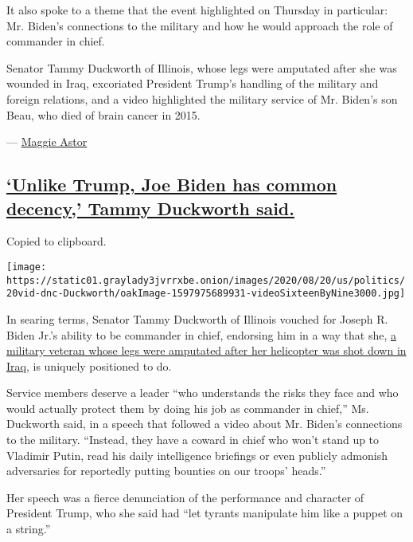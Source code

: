 It also spoke to a theme that the event highlighted on Thursday in
particular: Mr. Biden's connections to the military and how he would
approach the role of commander in chief.

Senator Tammy Duckworth of Illinois, whose legs were amputated after she
was wounded in Iraq, excoriated President Trump's handling of the
military and foreign relations, and a video highlighted the military
service of Mr. Biden's son Beau, who died of brain cancer in 2015.

--- \href{https://www.nytimes3xbfgragh.onion/by/maggie-astor}{Maggie
Astor}

\hypertarget{unlike-trump-joe-biden-has-common-decency-tammy-duckworth-said}{%
\subsection{\texorpdfstring{\protect\hyperlink{unlike-trump-joe-biden-has-common-decency-tammy-duckworth-said}{`Unlike
Trump, Joe Biden has common decency,' Tammy Duckworth
said.}}{`Unlike Trump, Joe Biden has common decency,' Tammy Duckworth said.}}\label{unlike-trump-joe-biden-has-common-decency-tammy-duckworth-said}}

Copied to clipboard.

\texttt{[image: https://static01.graylady3jvrrxbe.onion/images/2020/08/20/us/politics/20vid-dnc-Duckworth/oakImage-1597975689931-videoSixteenByNine3000.jpg]}

In searing terms, Senator Tammy Duckworth of Illinois vouched for Joseph
R. Biden Jr.'s ability to be commander in chief, endorsing him in a way
that she,
\href{https://www.nytimes3xbfgragh.onion/2020/06/25/us/politics/tammy-duckworth-vice-president-joe-biden.html}{a
military veteran whose legs were amputated after her helicopter was shot
down in Iraq}, is uniquely positioned to do.

Service members deserve a leader ``who understands the risks they face
and who would actually protect them by doing his job as commander in
chief,'' Ms. Duckworth said, in a speech that followed a video about Mr.
Biden's connections to the military. ``Instead, they have a coward in
chief who won't stand up to Vladimir Putin, read his daily intelligence
briefings or even publicly admonish adversaries for reportedly putting
bounties on our troops' heads.''

Her speech was a fierce denunciation of the performance and character of
President Trump, who she said had ``let tyrants manipulate him like a
puppet on a string.''

